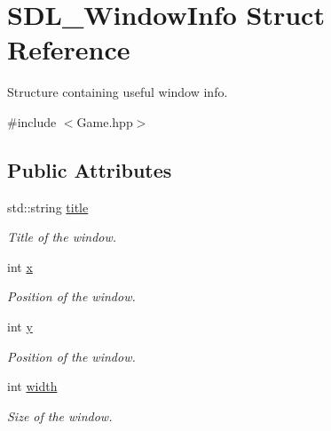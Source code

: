 \hypertarget{structSDL__WindowInfo}{}\section{S\+D\+L\+\_\+\+Window\+Info Struct Reference}
\label{structSDL__WindowInfo}


Structure containing useful window info.  




{\ttfamily \#include $<$Game.\+hpp$>$}

\subsection*{Public Attributes}
\begin{DoxyCompactItemize}
\item 
\mbox{\label{structSDL__WindowInfo_acd6a7d7cba722414292a594a3d48445c}} 
std\+::string \hyperlink{structSDL__WindowInfo_acd6a7d7cba722414292a594a3d48445c}{title}
\begin{DoxyCompactList}\small\item\em Title of the window. \end{DoxyCompactList}\item 
\mbox{\label{structSDL__WindowInfo_ab70b2d2424fe9f5e2f4e86c0e2be771a}} 
int \hyperlink{structSDL__WindowInfo_ab70b2d2424fe9f5e2f4e86c0e2be771a}{x}
\begin{DoxyCompactList}\small\item\em Position of the window. \end{DoxyCompactList}\item 
\mbox{\label{structSDL__WindowInfo_a8734912a3d6df22e9a7a31ae5eb291a2}} 
int \hyperlink{structSDL__WindowInfo_a8734912a3d6df22e9a7a31ae5eb291a2}{y}
\begin{DoxyCompactList}\small\item\em Position of the window. \end{DoxyCompactList}\item 
\mbox{\label{structSDL__WindowInfo_aa1e54155607b67024630859f2126c88b}} 
int \hyperlink{structSDL__WindowInfo_aa1e54155607b67024630859f2126c88b}{width}
\begin{DoxyCompactList}\small\item\em Size of the window. \end{DoxyCompactList}\item 

\end{DoxyCompactItemize}
